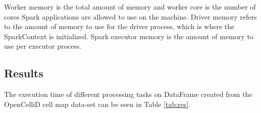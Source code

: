\begin{table}[h]
    \centering
    \caption{Specifications of test clusters}
    \label{tab:spec}
\end{table}

Worker memory is the total amount of memory and worker core is the number of cores Spark applications are allowed to use on the machine. Driver memory refers to the amount of memory to use for the driver process, which is where the SparkContext is initialized. Spark executor memory is the amount of memory to use per executor process. %
\cite{spark:rdds}

\subsection{Results}
The execution time of different processing tasks on DataFrame created from the OpenCelliD cell map data-set can be seen in Table \ref{tab:res}.

